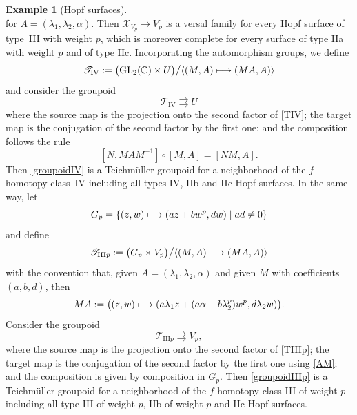 \documentclass[JEP,XML,SOM,Unicode]{cedram}
\let\mathcal\mathscr
\def\mto{\mathchoice{\longmapsto}{\mapsto}{\mapsto}{\mapsto}}
\newcommand{\GL}{\mathrm{GL}}
\theoremstyle{plain}
\theoremstyle{definition}
\newtheorem{example}[theorem]{Example}
\theoremstyle{remark}
\numberwithin{equation}{section}
\newcommand{\CC}{{\mathbb{C}}}
\begin{document}
\begin{example}[Hopf surfaces]
\begin{equation}
\end{equation}
for $A=(\lambda_1,\lambda_2,\alpha)$. Then $\mathcal X_{V_p}\to V_p$ is a versal family for every Hopf surface of type~III with weight $p$, which is moreover complete for every surface of type IIa with weight $p$ and of type IIc. Incorporating the automorphism groups, we define
\begin{equation}
\label{TIV}
\mathcal T_\mathrm{IV}:=\big (\GL_2(\CC)\times U\big )\big / \langle (M,A)\mto (MA, A)\rangle
\end{equation}
and consider the groupoid
\begin{equation}
\label{groupoidIV}
\mathcal T_\mathrm{IV}\rightrightarrows U
\end{equation}
where the source map is the projection onto the second factor of \eqref{TIV}; the target map is the conjugation of the second factor by the first one; and the composition follows the rule
\begin{equation}
\label{compIV}
[N,MAM^{-1}]\circ[M,A]=[NM,A].
\end{equation}
Then \eqref{groupoidIV} is a Teichmüller groupoid for a neighborhood of the $f$-homotopy class~IV including all types IV, IIb and IIc Hopf surfaces. In the same way, let
\begin{equation}
\label{Gp}
G_p=\{(z,w)\mto (az+bw^p, dw)\mid ad\not =0\}
\end{equation}
and define
\begin{equation}
\label{TIIIp}
\mathcal T_{\mathrm{III}p}:=\big (G_p\times V_p\big )\big / \langle (M,A)\mto (MA, A)\rangle
\end{equation}
with the convention that, given $A=(\lambda_1,\lambda_2,\alpha)$ and given $M$ with coefficients $(a,b,d)$, then
\begin{equation}
\label{AM}
MA:=\big ((z,w)\mto (a\lambda_1 z+(a\alpha + b\lambda_2^p)w^p,d\lambda_2 w)\big ).
\end{equation}
Consider the groupoid
\begin{equation}
\label{groupoidIIIp}
\mathcal T_{\mathrm{III}p}\rightrightarrows V_p,
\end{equation}
where the source map is the projection onto the second factor of \eqref{TIIIp}; the target map is the conjugation of the second factor by the first one using \eqref{AM}; and the composition is given by composition in $G_p$.
Then \eqref{groupoidIIIp} is a Teichmüller groupoid for a neighborhood of the $f$-homotopy class III of weight $p$ including all type III of weight $p$, IIb of weight $p$ and IIc Hopf surfaces.


\end{example}
\end{document}
